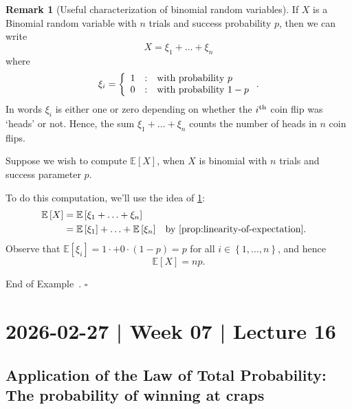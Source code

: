 \documentclass[10pt]{article}
\theoremstyle{definition}
\newtheorem{remark}[theorem]{Remark}
\newtheorem{example}[theorem]{Example}
\renewenvironment{example}
{\begin{oldexample}}
  {\par\smallskip\hfill   End of Example~\theexample. $\square$    \par\end{oldexample}}
\newcommand{\1}[1]{\textbf{1}_{\left[#1\right]}} %
\def\E{\mathbb{E}} %
\begin{document}
\begin{remark}[Useful characterization of binomial random variables]
  \label{rmk:useful-characterization-binomial-random-variables}
  If $X$ is a Binomial random variable with $n$
  trials and success probability $p$, then we can write
  \begin{equation*}
    X = \xi_{1}+\ldots+\xi_{n}
  \end{equation*}
  where
  \begin{equation*}
    \xi_{i} = \left\{ \begin{array}{l@{\quad:\quad}l} 1 & \text{with probability
        }p\\0 & \text{with probability }1-p \end{array}\right..
  \end{equation*}
  In words $\xi_{i}$ is either one or zero depending on whether the
  $i^{\rm th}$ coin flip was `heads' or not. Hence, the sum
  $\xi_{1}+\ldots+\xi_{n}$ counts the number of heads in $n$ coin flips.
\end{remark}

\begin{example}
  Suppose we wish to compute $\E\left[X \right]$, when $X$ is binomial with
  $n$ trials and success parameter $p$.

  To do this computation, we'll use the idea of
  \cref{rmk:useful-characterization-binomial-random-variables}:
  \begin{align*}
    \E\left[X \right] 
    &= \E\left[\xi_{1}+\ldots+\xi_{n} \right]\\ 
    &= \E\left[\xi_{1} \right]+\ldots+ \E\left[\xi_{n} \right] &&\text{by \cref{prop:linearity-of-expectation}}.
  \end{align*}
  Observe that $\E\left[\xi_{i} \right]=1\cdotp+0\cdot(1-p)=p$ for all $i\in
  \left\{1,\ldots,n\right\}$, and hence
  \begin{equation*}
    \E\left[X \right]= n p.
  \end{equation*}
\end{example}
\newpage
\section{2026-02-27 | Week 07 | Lecture 16}

\subsection{Application of the Law of Total Probability: The probability of winning at craps}
\end{document}
